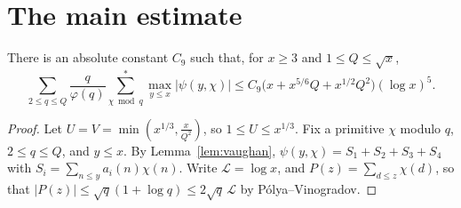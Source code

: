 \section{The main estimate}

\begin{theorem}\label{thm:mainest}
There is an absolute constant $C_9$ such that, for $x\ge3$ and $1\le Q\le\sqrt x$,
\[
\sum_{2\le q\le Q}\frac q{\varphi(q)}\sum^*_{\chi\bmod q}\max_{y\le x}|\psi(y,\chi)|\le C_9\bigl(x+x^{5/6}Q+x^{1/2}Q^2\bigr)(\log x)^5.
\]
\end{theorem}
\begin{proof}
Let $U=V=\min(x^{1/3},\frac x{Q^2})$, so $1\le U\le x^{1/3}$. Fix a primitive $\chi$ modulo $q$, $2\le q\le Q$, and $y\le x$. By Lemma~\ref{lem:vaughan}, $\psi(y,\chi)=S_1+S_2+S_3+S_4$ with $S_i=\sum_{n\le y}a_i(n)\chi(n)$. Write $\mathcal L=\log x$, and $P(z)=\sum_{d\le z}\chi(d)$, so that $|P(z)|\le\sqrt q(1+\log q)\le2\sqrt q\,\mathcal L$ by Pólya--Vinogradov.


\end{proof}
